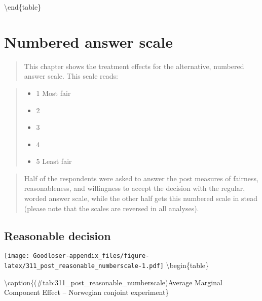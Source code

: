 \documentclass[
]{book}
\providecommand{\tightlist}{%
  \setlength{\itemsep}{0pt}\setlength{\parskip}{0pt}}
\begin{document}
\textbackslash end\{table\}

\hypertarget{numbered-answer-scale}{%
\chapter{Numbered answer scale}\label{numbered-answer-scale}}

\begin{quote}
This chapter shows the treatment effects for the alternative, numbered answer scale. This scale reads:
\end{quote}

\begin{quote}
\begin{itemize}
\tightlist
\item
  1 Most fair\\
\item
  2\\
\item
  3\\
\item
  4\\
\item
  5 Least fair
\end{itemize}
\end{quote}

\begin{quote}
Half of the respondents were asked to answer the post measures of fairness, reasonableness, and willingness to accept the decision with the regular, worded answer scale, while the other half gets this numbered scale in stead (please note that the scales are reversed in all analyses).
\end{quote}

\hypertarget{reasonable-decision-4}{%
\section{Reasonable decision}\label{reasonable-decision-4}}

\texttt{[image: Goodloser-appendix\_files/figure-latex/311\_post\_reasonable\_numberscale-1.pdf]} \textbackslash begin\{table\}

\textbackslash caption\{(\#tab:311\_post\_reasonable\_numberscale)Average Marginal Component Effect -- Norwegian conjoint experiment\}
\centering
\end{document}
